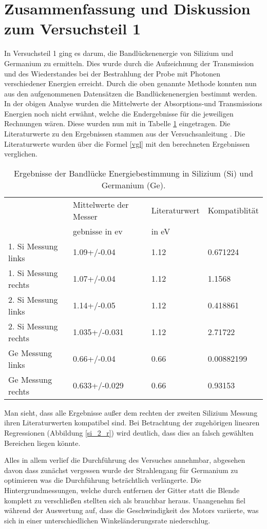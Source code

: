\section{Zusammenfassung und Diskussion zum Versuchsteil 1}
In Versuchsteil 1 ging es darum, die Bandlückenenergie von Silizium und Germanium zu ermitteln. Dies wurde durch die Aufzeichnung der Transmission und des Wiederstandes bei der Bestrahlung der Probe mit Photonen verschiedener Energien erreicht. Durch die oben genannte Methode konnten nun aus den aufgenommenen Datensätzen  die Bandlückenenergien bestimmt werden. In der obigen Analyse wurden die Mittelwerte der Absorptions-und Transmissions Energien noch nicht erwähnt, welche die Endergebnisse für die jeweiligen Rechnungen wären. Diese wurden nun mit in Tabelle \ref{ende_v1} eingetragen. 
Die Literaturwerte zu den Ergebnissen stammen aus der Versuchsanleitung \cite{anleitung}. Die Literaturwerte wurden über die Formel \ref{vgl} mit den berechneten Ergebnissen verglichen. 
\begin{table}
	\centering
	\caption[Ergebnisse V1]{Ergebnisse der Bandlücke Energiebestimmung in Silizium (Si) und Germanium (Ge).}
	\label{ende_v1}
	\begin{tabular}{llll}
		\toprule
		{} & Mittelwerte der Messer & Literaturwert& Kompatiblität \\
		{} & gebnisse in ev & in eV & \\
		\midrule
		1. Si Messung links  &                          1.09+/-0.04 &                1.12 &      0.671224 \\
		1. Si Messung rechts &                          1.07+/-0.04 &                1.12 &        1.1568 \\
		2. Si Messung links  &                          1.14+/-0.05 &                1.12 &      0.418861 \\
		2. Si Messung rechts &                        1.035+/-0.031 &                1.12 &       2.71722 \\
		Ge Messung links     &                          0.66+/-0.04 &                0.66 &    0.00882199 \\
		Ge Messung rechts    &                        0.633+/-0.029 &                0.66 &       0.93153 \\
		\bottomrule
	\end{tabular}
\end{table}

Man sieht, dass alle Ergebnisse außer dem rechten der zweiten Silizium Messung ihren Literaturwerten kompatibel sind. Bei Betrachtung der zugehörigen linearen Regressionen (Abbildung \ref{si_2_r}) wird deutlich, dass dies an falsch gewählten Bereichen liegen könnte. \par 
Alles in allem verlief die Durchführung des Versuches annehmbar, abgesehen davon dass zunächst vergessen wurde der Strahlengang für Germanium zu optimieren was die Durchführung beträchtlich verlängerte. Die Hintergrundmessungen, welche durch entfernen der Gitter statt die Blende komplett zu verschließen stellten sich als brauchbar heraus. Unangenehm fiel während der Auswertung auf, dass die Geschwindigkeit des Motors variierte, was sich in einer unterschiedlichen Winkeländerungsrate niederschlug.